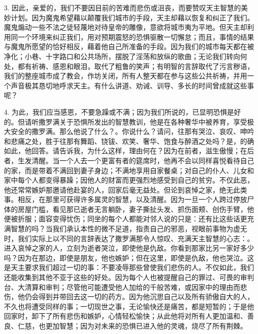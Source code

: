 3. 因此，亲爱的，我们不要因目前的苦难而悲伤或沮丧，而要赞叹天主智慧的美妙计划。因为魔鬼希望藉以颠覆我们城市的手段，天主却藉以恢复和纠正了我们。魔鬼煽动一些不法之徒轻蔑地对待皇帝的雕像，意欲将城市夷为平地。但天主却利用同一个环境来纠正我们，用对预期震怒的恐惧驱散一切懈怠；而且，事情的结果与魔鬼所愿望的恰好相反，藉着他自己所准备的手段。因为我们的城市每天都在被净化；小巷、十字路口和公共场所，摆脱了淫荡和放纵的歌曲；无论我们转向何处，都有祈祷、感恩和眼泪，取代了粗鲁的笑声；有明智的言辞取代了污言秽语，我们的整座城市成了教会，作坊关闭，所有人整天都在参与这些公共祈祷，并用一个声音极其恳切地呼求天主。有什么讲道、劝诫、训导、多长的时间曾成就这些事呢？\par

4. 为此，我们应当感恩，不要急躁或不满；因为我们所说的，已显明恐惧是好的。但请听撒罗满关于恐惧所发出的智慧教训，他是在各种奢华中被养育，享受极大安全的撒罗满。那么他说了什么？。你说什么？请问，往那有哭泣、哀叹、呻吟和悲痛之处，胜于往那有舞蹈、铙钹、欢笑、奢华、饱食与醉酒之处吗？是，的确如此，他回答。请告诉我，为什么这样，理由何在？因为在前者，滋生傲慢；在后者，生发清醒。当一个人去一个更富有者的筵席时，他再不会以同样喜悦看待自己的家，而是带着不满回到妻子身边；不满地享用自家餐桌；对自己的仆人、儿女和家中每个人都变得暴躁；因他人的财富而更强烈地感受到自己的贫穷。不仅此恶，他还常常嫉妒那邀请他赴宴的人，回家后毫无益处。但论到哀悼之家，绝无此类事。相反，在那里可获得许多属灵的智慧，以及清醒。因为一旦一个人跨过停放尸体的房屋门槛，看见那已逝者无言躺卧，妻子撕扯头发、抓伤面颊、创伤手臂，他便被折服；面容变得忧伤；同坐的每个人都能对邻人说的只是：还有比这些话更充满智慧的吗？当我们承认本性的微不足道，指责自己的邪恶，视眼前事物为虚无时，我们实际上以不同的言辞表达了撒罗满那令人惊叹、充满天主智慧的心志：。进入哀悼之家的人，立刻为逝者哭泣，即使他是仇敌。你看到那家比另一家好多少吗？因为在那边，即使是朋友，他也嫉妒；但在这里，即使是仇敌，他也哭泣。这是天主要求我们超过一切的事：不要凌辱那些曾使我们悲伤的人。不仅如此，我们还能收集到其他不亚于这些的好处。因为每个人也被提醒自己的罪过、可畏的审判台、大清算和审判；尽管他可能遭受他人加给的千般苦难，或因家中的理由而悲伤，他仍会得到并带回去这一切的药方。因为他沉思自己以及所有骄傲自大的人，不久也将遭受同样的事；一切现世之事，无论愉快还是痛苦，都是短暂的；于是他回家时，卸下了所有悲伤和嫉妒，心情轻松愉快；从此他将对所有人更加温和、善良、仁慈，也更加智慧；因为对未来的恐惧已进入他的灵魂，烧尽了所有荆棘。\par

